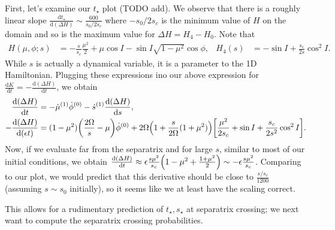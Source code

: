\documentclass[11pt,
        usenames, %
        dvipsnames %
    ]{article}
\newcommand*{\rd}[2]{\frac{\mathrm{d}#1}{\mathrm{d}#2}}
\DeclarePairedDelimiter\p{\lparen}{\rparen}
\DeclarePairedDelimiter\s{\lbrack}{\rbrack}
\begin{document}
First, let's examine our $t_{\star}$ plot (TODO add). We observe that there is a
roughly linear slope $\rd{t_{\star}}{(\Delta H)} \sim \frac{600}{s_0/2s_c}$
where $-s_0/2s_c$ is the minimum value of $H$ on the domain and so is the
maximum value for $\Delta H = H_4 - H_0$. Note that
\begin{align*}
    H(\mu, \phi; s) &= -\frac{s}{s_c}\frac{\mu^2}{2}
        + \mu \cos I - \sin I \sqrt{1 - \mu^2}\cos \phi, &
    H_4(s) &= -\sin I + \frac{s_c}{2s}\cos^2 I.
\end{align*}
While $s$ is actually a dynamical variable, it is a parameter to the 1D
Hamiltonian. Plugging these expressions ino our above expression for $\rd{K}{t}
= -\rd{(\Delta H)}{t}$, we obtain
\begin{align}
    \rd{(\Delta H)}{t} &= -\dot{\mu}^{(1)}\dot{\phi}^{(0)} - \dot{s}^{(1)}
            \rd{(\Delta H)}{s},\\
    -\rd{(\Delta H)}{(\epsilon t)} &= (1 - \mu^2)\p*{\frac{2\Omega}{s} - \mu}
            \dot{\phi}^{(0)} + 2\Omega\p*{1 + \frac{s}{2\Omega}(1 + \mu^2)}
            \s*{\frac{\mu^2}{2s_c} + \sin I + \frac{s_c}{2s^2}\cos^2 I}.
\end{align}
Now, if we evaluate far from the separatrix and for large $s$, similar to most
of our initial conditions, we obtain $\rd{(\Delta H)}{t} \approx \epsilon
\frac{s\mu^2}{s_c}\p*{1 - \mu^2 + \frac{1 + \mu^2}{2}} \sim
-\epsilon\frac{s\mu^2}{s_c}$. Comparing to our plot, we would predict that this
derivative should be close to $\frac{s/s_c}{1200}$ (assuming $s \sim s_0$
initially), so it seems like we at least have the scaling correct.

This allows for a rudimentary prediction of $t_{\star}, s_{\star}$ at separatrix
crossing; we next want to compute the separatrix crossing probabilities.
\end{document}
